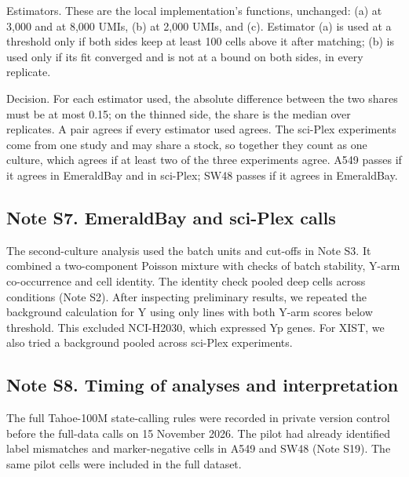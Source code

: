 \documentclass[
  11pt,
  letterpaper,
]{article}
\begin{document}
Estimators. These are the local implementation's functions, unchanged:
(a) at 3,000 and at 8,000 UMIs, (b) at 2,000 UMIs, and (c). Estimator
(a) is used at a threshold only if both sides keep at least 100 cells
above it after matching; (b) is used only if its fit converged and is
not at a bound on both sides, in every replicate.

Decision. For each estimator used, the absolute difference between the
two shares must be at most 0.15; on the thinned side, the share is the
median over replicates. A pair agrees if every estimator used agrees.
The sci-Plex experiments come from one study and may share a stock, so
together they count as one culture, which agrees if at least two of the
three experiments agree. A549 passes if it agrees in EmeraldBay and in
sci-Plex; SW48 passes if it agrees in EmeraldBay.

\subsection{Note S7. EmeraldBay and sci-Plex
calls}\label{note-s7.-emeraldbay-and-sci-plex-calls}

The second-culture analysis used the batch units and cut-offs in Note
S3. It combined a two-component Poisson mixture with checks of batch
stability, Y-arm co-occurrence and cell identity. The identity check
pooled deep cells across conditions (Note S2). After inspecting
preliminary results, we repeated the background calculation for Y using
only lines with both Y-arm scores below threshold. This excluded
NCI-H2030, which expressed Yp genes. For XIST, we also tried a
background pooled across sci-Plex experiments.

\subsection{Note S8. Timing of analyses and
interpretation}\label{note-s8.-timing-of-analyses-and-interpretation}

The full Tahoe-100M state-calling rules were recorded in private version
control before the full-data calls on 15 November 2026. The pilot had
already identified label mismatches and marker-negative cells in A549
and SW48 (Note S19). The same pilot cells were included in the full
dataset.
\end{document}
